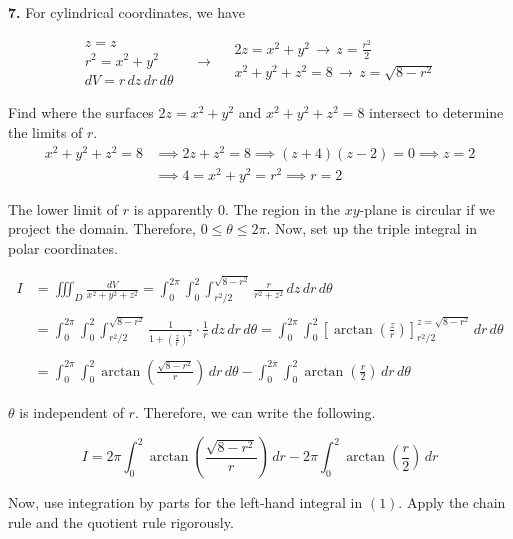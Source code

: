 \documentclass{article}
\begin{document}
\vspace{1em}

\textbf{7.} For cylindrical coordinates, we have

\[
\begin{array}{c}
z=z\\
r^2=x^2+y^2\\
dV=r\,dz\,dr\,d\theta
\end{array}\quad\rightarrow\quad
\begin{array}{c}
\displaystyle2z=x^2+y^2\,\rightarrow\,z=\frac{r^2}2\\[0.3cm]
x^2+y^2+z^2=8\,\rightarrow\,z=\sqrt{8-r^2}\\
\end{array}
\]

Find where the surfaces $2z=x^2+y^2$ and $x^2+y^2+z^2=8$ intersect to determine the limits of $r$.
\begin{align*}x^2+y^2+z^2=8&\implies 2z + z^2 = 8\implies (z+4)(z-2) = 0\implies z=2\\&\implies4=x^2+y^2=r^2 \implies r=2\end{align*}

The lower limit of $r$ is apparently $0$. The region in the $xy$-plane is circular if we project the domain. Therefore, $0\leq\theta\leq2\pi$. Now, set up the triple integral in polar coordinates.

\begin{align*}{I}&=\iiint_D\frac{dV}{x^2+y^2+z^2}=\int_0^{2\pi}\int_0^2\int_{r^2/2}^{\sqrt{8-r^2}}\frac{r}{r^2+z^2}\,dz\,dr\,d\theta\\\\&=\int_0^{2\pi}\int_0^2\int_{r^2/2}^{\sqrt{8-r^2}}\frac{1}{1+\left(\frac zr\right)^2}\cdot\frac1r\,dz\,dr\,d\theta=\int_0^{2\pi}\int_0^2\left[\arctan\left(\frac zr\right)\right]_{r^2/2}^{z=\sqrt{8-r^2}}\,dr\,d\theta\\\\&=\int_0^{2\pi}\int_0^2\arctan\left(\frac{\sqrt{8-r^2}}r\right)\,dr\,d\theta-\int_0^{2\pi}\int_0^2\arctan\left(\frac r2\right)\,dr\,d\theta\end{align*}

$\theta$ is independent of $r$. Therefore, we can write the following.

\begin{equation}
{I}=2\pi\int_0^2\arctan\left(\frac{\sqrt{8-r^2}}r\right)\,dr-2\pi\int_0^2\arctan\left(\frac r2\right)\,dr
\end{equation}

Now, use integration by parts for the left-hand integral in $(1)$. Apply the chain rule and the quotient rule rigorously.
\end{document}
